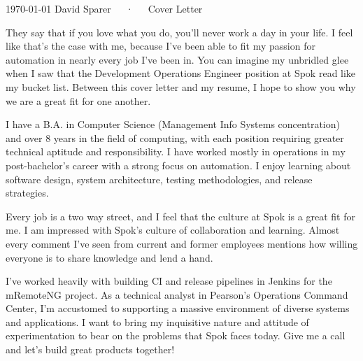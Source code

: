 \documentclass[11pt, a4paper]{awesome-cv}
\begin{document}
	\makecvheader[R]

	\makecvfooter
	  {\today}
	  {David Sparer~~~·~~~Cover Letter}
	  {}

	\makelettertitle

	\begin{cvletter}

		They say that if you love what you do, you'll never work a day in your life. I feel like that's the case with me, because I've been able to fit my passion for automation in nearly every job I've been in. You can imagine my unbridled glee when I saw that the Development Operations Engineer position at Spok read like my bucket list. Between this cover letter and my resume, I hope to show you why we are a great fit for one another.

		I have a B.A. in Computer Science (Management Info Systems concentration) and over 8 years in the field of computing, with each position requiring greater technical aptitude and responsibility. I have worked mostly in operations in my post-bachelor's career with a strong focus on automation. I enjoy learning about software design, system architecture, testing methodologies, and release strategies.

		Every job is a two way street, and I feel that the culture at Spok is a great fit for me. I am impressed with Spok's culture of collaboration and learning. Almost every comment I've seen from current and former employees mentions how willing everyone is to share knowledge and lend a hand.

		I've worked heavily with building CI and release pipelines in Jenkins for the mRemoteNG project. As a technical analyst in Pearson's Operations Command Center, I'm accustomed to supporting a massive environment of diverse systems and applications. I want to bring my inquisitive nature and attitude of experimentation to bear on the problems that Spok faces today. Give me a call and let's build great products together!

	\end{cvletter}


	\makeletterclosing
\end{document}
